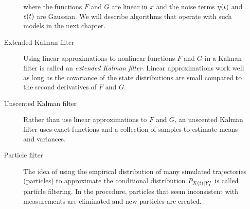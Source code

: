 \begin{description}
  where the functions $F$ and $G$ are linear in $x$ and the noise
  terms ${\eta}{(t)}$ and ${\epsilon}{(t)}$ are Gaussian.  We will
  describe algorithms that operate with such models in the next
  chapter.
\item[Extended Kalman filter] Using linear approximations to nonlinear
  functions $F$ and $G$ in a Kalman filter is called an \emph{extended
  Kalman filter}.  Linear approximations work well as long as the
  covariance of the state distributions are small compared to the
  second derivatives of $F$ and $G$.
\item[Unscented Kalman filter] Rather than use linear approximations
  to $F$ and $G$, an unscented Kalman filter\cite{Julier97} uses exact
  functions and a collection of samples to estimate means and
  variances.
\item[Particle filter] The idea of using the empirical distribution of
  many simulated trajectories (particles) to approximate the
  conditional distribution $P_{{X}{(t)}|Y_{1}^{t}}$ is called
  particle filtering\cite{Gordon93,Kitagawa96}.  In the procedure,
  particles that seem inconsistent with measurements are eliminated
  and new particles are created. 
\end{description}





\begin{CVSID}
\end{CVSID}
